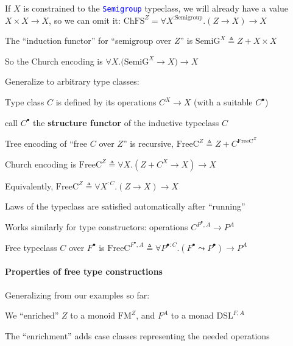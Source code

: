 If $X$ is constrained to the \texttt{\textcolor{blue}{\footnotesize{}Semigroup}}
typeclass, we will already have a value {\footnotesize{}$X\times X\rightarrow X$},
so we can omit it: {\footnotesize{}$\text{ChFS}^{Z}=\forall X^{:\text{Semigroup}}.\left(Z\rightarrow X\right)\rightarrow X$}{\footnotesize\par}

The \textsf{``}induction functor\textsf{''} for \textsf{``}semigroup over $Z$\textsf{''} is {\footnotesize{}$\text{SemiG}^{X}\triangleq Z+X\times X$}{\footnotesize\par}

So the Church encoding is $\forall X.\big(\text{SemiG}^{X}\rightarrow X\big)\rightarrow X$

Generalize to arbitrary type classes:

Type class $C$ is defined by its operations{\footnotesize{} $C^{X}\rightarrow X$}
(with a suitable $C^{\bullet}$)

call $C^{\bullet}$ the \textbf{structure functor} of the inductive
typeclass $C$

Tree encoding of \textsf{``}free $C$ over $Z$\textsf{''} is recursive, $\text{FreeC}^{Z}\triangleq Z+C^{\text{FreeC}^{Z}}$

Church encoding is $\text{FreeC}^{Z}\triangleq\forall X.\left(Z+C^{X}\rightarrow X\right)\rightarrow X$

Equivalently, $\text{FreeC}^{Z}\triangleq\forall X^{:C}.\left(Z\rightarrow X\right)\rightarrow X$

Laws of the typeclass are satisfied automatically after \textsf{``}running\textsf{''}

Works similarly for type constructors: operations $C^{P^{\bullet},A}\rightarrow P^{A}$

Free typeclass $C$ over $F^{\bullet}$ is $\text{FreeC}^{F^{\bullet},A}\triangleq\forall P^{\bullet:C}.\left(F^{\bullet}\leadsto P^{\bullet}\right)\rightarrow P^{A}$

\paragraph{Properties of free type constructions}

Generalizing from our examples so far:

We \textsf{``}enriched\textsf{''} $Z$ to a monoid $\text{FM}^{Z}$, and $F^{A}$
to a monad $\text{DSL}^{F,A}$ 

The \textsf{``}enrichment\textsf{''} adds case classes representing the needed operations

